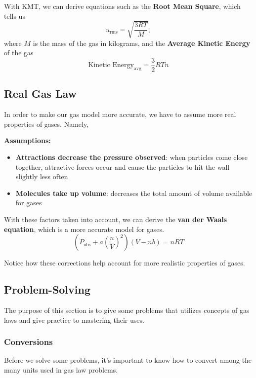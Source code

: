 \noindent With KMT, we can derive equations such as the \textbf{Root Mean Square}, which tells us
\begin{equation}
    \boxed{u_{\text{rms}} = \sqrt{\frac{3RT}{M}}},
\end{equation}
where $M$ is the mass of the gas in kilograms, and the \textbf{Average Kinetic Energy} of the gas
\begin{equation}
    \boxed{\text{Kinetic Energy}_{\text{avg}} = \frac{3}{2}RTn}
\end{equation}
\subsection{Real Gas Law}
In order to make our gas model more accurate, we have to assume more real properties of gases. Namely, 

\noindent \textbf{Assumptions:}
\begin{itemize}
    \item \textbf{Attractions decrease the pressure observed}: when particles come close together, attractive forces occur and cause the particles to hit the wall slightly less often 
    \item \textbf{Molecules take up volume}: decreases the total amount of volume available for gases
\end{itemize}

With these factors taken into account, we can derive the \textbf{van der Waals equation}, which is a more accurate model for gases.
\begin{equation}
    \boxed{\left(P_{\text{obs}}+a\left(\frac{n}{V}\right)^2\right)(V-nb) = nRT}
\end{equation}

Notice how these corrections help account for more realistic properties of gases.

\subsection{Problem-Solving}
The purpose of this section is to give some problems that utilizes concepts of gas laws and give practice to mastering their uses.

\subsubsection{Conversions}
Before we solve some problems, it's important to know how to convert among the many units used in gas law problems.

